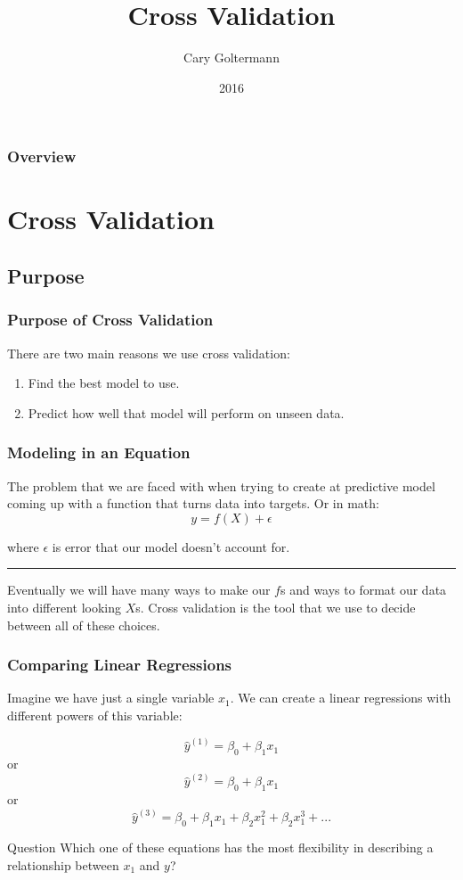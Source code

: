 \documentclass{beamer}
\title{Cross Validation}
\author{Cary Goltermann}
\institute{Galvanize}
\date{2016}
\begin{document}
\frame{\titlepage}

\begin{frame}
  \frametitle{Overview}
  \tableofcontents[]
\end{frame}

\section{Cross Validation}
\subsection{Purpose}
\begin{frame}
  \frametitle{Purpose of Cross Validation}
  {\large There are two main reasons we use cross validation:} \vspace{4mm}
  \begin{enumerate}
    \item Find the best model to use. \pause
    \item Predict how well that model will perform on unseen data.
  \end{enumerate}
\end{frame}

\begin{frame}
  \frametitle{Modeling in an Equation}
  The problem that we are faced with when trying to create at predictive model coming up with a function that turns data into targets. Or in math:
  $$ y = f(X) + \epsilon $$

  where $\epsilon$ is error that our model doesn't account for. \vspace{2mm} 

  \pause
  \noindent\hfil\rule{\textwidth}{.4pt}\hfil \vspace{3mm}

  Eventually we will have many ways to make our $f$s and ways to format our data into different looking $X$s. Cross validation is the tool that we use to decide between all of these choices.
 
\end{frame}

\begin{frame}
  \frametitle{Comparing Linear Regressions}
  Imagine we have just a single variable $x_1$. We can create a linear regressions with different powers of this variable:

  $$ \hat{y}^{(1)} = \beta_0 + \beta_1 x_1 $$
  or
  $$ \hat{y}^{(2)} = \beta_0 + \beta_1 x_1 $$
  or
  $$ \hat{y}^{(3)} = \beta_0 + \beta_1 x_1 + \beta_2 x_1^2 + \beta_2 x_1^3 + ... $$ \pause
  \begin{block}{Question}
    Which one of these equations has the most flexibility in describing a relationship between $x_1$ and $y$?
  \end{block}
\end{frame}
\end{document}
